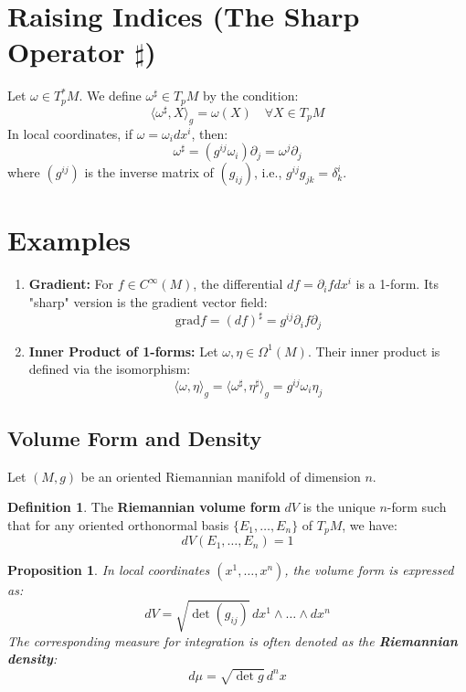 \documentclass[11pt, a4paper]{article}
\theoremstyle{plain}
\newtheorem{proposition}[theorem]{Proposition}
\theoremstyle{definition}
\newtheorem{definition}[theorem]{Definition}
\theoremstyle{remark}
\begin{document}
\section*{Raising Indices (The Sharp Operator $\sharp$)}
Let $\omega \in T_p^* M$. We define $\omega^\sharp \in T_p M$ by the condition:
\[ \langle \omega^\sharp, X \rangle_g = \omega(X) \quad \forall X \in T_p M \]
In local coordinates, if $\omega = \omega_i dx^i$, then:
\[ \omega^\sharp = (g^{ij} \omega_i) \partial_j = \omega^j \partial_j \]
where $(g^{ij})$ is the inverse matrix of $(g_{ij})$, i.e., $g^{ij} g_{jk} = \delta^i_k$.

\section*{Examples}
\begin{enumerate}
    \item \textbf{Gradient:} For $f \in C^\infty(M)$, the differential $df = \partial_i f dx^i$ is a 1-form. Its "sharp" version is the gradient vector field:
    \[ \text{grad} f = (df)^\sharp = g^{ij} \partial_i f \partial_j \]
    \item \textbf{Inner Product of 1-forms:} Let $\omega, \eta \in \Omega^1(M)$. Their inner product is defined via the isomorphism:
    \[ \langle \omega, \eta \rangle_g = \langle \omega^\sharp, \eta^\sharp \rangle_g = g^{ij} \omega_i \eta_j \]
\end{enumerate}

\subsection{Volume Form and Density}

Let $(M, g)$ be an oriented Riemannian manifold of dimension $n$.

\begin{definition}
The \textbf{Riemannian volume form} $dV$ is the unique $n$-form such that for any oriented orthonormal basis $\{E_1, \dots, E_n\}$ of $T_p M$, we have:
\[ dV(E_1, \dots, E_n) = 1 \]
\end{definition}

\begin{proposition}
In local coordinates $(x^1, \dots, x^n)$, the volume form is expressed as:
\[ dV = \sqrt{\det(g_{ij})} \, dx^1 \wedge \dots \wedge dx^n \]
The corresponding measure for integration is often denoted as the \textbf{Riemannian density}:
\[ d\mu = \sqrt{\det g} \, d^n x \]
\end{proposition}
\end{document}
